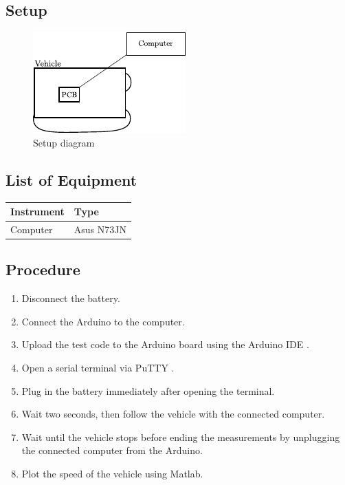 \subsection{Setup}
\begin{figure}[H]
	\centering
	\includegraphics[scale=1.6]{figures/inertiaTestSetupDiagram2.pdf}
	\caption{Setup diagram}
	\label{inertiaTestSetupDiagram}
\end{figure}\vspace{-5mm}

\subsection{List of Equipment}

\begin{table}[H]
\begin{tabular}{|p{10cm}|p{4cm}|}
\hline%
  \textbf{Instrument}                     &  \textbf{Type}       \\
\hline%
  Computer                                &  Asus N73JN    \\
\hline %
\end{tabular}
\end{table}

\subsection{Procedure}

\begin{enumerate}
  \item Disconnect the battery.
  \item Connect the Arduino to the computer.
  \item Upload the test code to the Arduino board using the Arduino IDE \cite{ArduinoIDE}.
  \item Open a serial terminal via PuTTY \cite{PuTTY}.
  \item Plug in the battery immediately after opening the terminal.
  \item Wait two seconds, then follow the vehicle with the connected computer.
  \item Wait until the vehicle stops before ending the measurements by unplugging the connected computer from the Arduino.
  \item Plot the speed of the vehicle using Matlab.
\end{enumerate}

